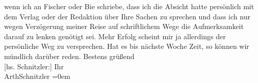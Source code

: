 \begin{ledgroupsized}[t]{13cm}
                    wenn ich an Fischer oder Bie schriebe, dass ich die Absicht hatte persönlich mit
                    dem Verlag oder der Redaktion über Ihre Sachen zu
                    sprechen und dass ich nur wegen Verzögerung meiner Reise auf schriftlichem Wege
                    die Aufmerksamkeit darauf zu lenken genötigt sei. Mehr Erfolg scheint mir ja
                    allerdings der persönliche Weg zu versprechen. Hat es bis nächste Woche Zeit, so
                    können wir mündlich darüber reden.\pend
           \pstart
           Bestens grüßend{\\[\baselineskip]}{[}hs. Schnitzler:{]} Ihr{\\[\baselineskip]}\spacefill\mbox{ArthSchnitzler}\pend
           \leftskip=0em{}
         
         \endnumbering{}\end{ledgroupsized}  \newcommand{\dateiname}{L01888}\newcommand{\titel}{Arthur Schnitzler an Albert Ehrenstein, 23. 11. 1909}\newcommand{\editorInnen}{Martin Anton Müller und Gerd-Hermann Susen}
      
